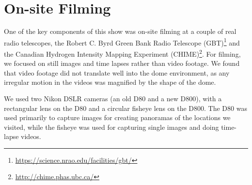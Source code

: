 \section{On-site Filming}
One of the key components of this show was on-site filming at a couple of real radio telescopes, the Robert C. Byrd Green Bank Radio Telescope (GBT)\footnote{\url{https://science.nrao.edu/facilities/gbt/}} and the Canadian Hydrogen Intensity Mapping Experiment (CHIME)\footnote{\url{http://chime.phas.ubc.ca/}}. For filming, we focused on still images and time lapses rather than video footage. We found that video footage did not translate well into the dome environment, as any irregular motion in the videos was magnified by the shape of the dome.  

We used two Nikon DSLR cameras (an old D80 and a new D800), with a rectangular lens on the D80 and a circular fisheye lens on the D800. The D80 was used primarily to capture images for creating panoramas of the locations we visited, while the fisheye was used for capturing single images and doing time-lapse videos. 


